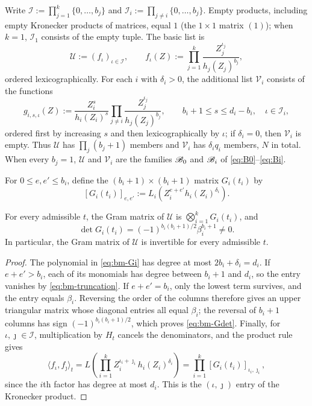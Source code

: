Write $\mathcal I:=\prod_{j=1}^k\{0,\ldots,b_j\}$ and
$\mathcal I_i:=\prod_{j\ne i}\{0,\ldots,b_j\}$. Empty products,
including empty Kronecker products of matrices, equal $1$ (the
$1\times1$ matrix $(1)$); when $k=1$, $\mathcal I_1$ consists of the
empty tuple. The basic list is
\begin{equation}\label{eq:bm-U}
\mathscr U:=(f_\iota)_{\iota\in\mathcal I},
\qquad
f_\iota(Z):=\prod_{j=1}^k\frac{Z_j^{\iota_j}}{h_j(Z_j)^{b_j}},
\end{equation}
ordered lexicographically. For each $i$ with $\delta_i>0$, the
additional list $\mathscr V_i$ consists of the functions
\begin{equation}\label{eq:bm-V}
g_{i,s,\iota}(Z):=\frac{Z_i^s}{h_i(Z_i)^s}
\prod_{j\ne i}\frac{Z_j^{\iota_j}}{h_j(Z_j)^{b_j}},
\qquad
b_i+1\le s\le d_i-b_i,\quad \iota\in\mathcal I_i,
\end{equation}
ordered first by increasing $s$ and then lexicographically by $\iota$;
if $\delta_i=0$, then $\mathscr V_i$ is empty. Thus $\mathscr U$ has
$\prod_j(b_j+1)$ members and $\mathscr V_i$ has $\delta_iq_i$ members,
$N$ in total. When every $b_j=1$, $\mathscr U$ and $\mathscr V_i$ are
the families $\mathscr B_0$ and $\mathscr B_i$ of \eqref{eq:B0}--\eqref{eq:Bi}.

For $0\le e,e'\le b_i$, define the $(b_i+1)\times(b_i+1)$ matrix
$G_i(t_i)$ by
\begin{equation}\label{eq:bm-Gi}
[G_i(t_i)]_{e,e'}:=L_i\!\left(Z_i^{e+e'}h_i(Z_i)^{\delta_i}\right).
\end{equation}

\begin{lemma}\label{lem:bm-basic}
For every admissible $t$, the Gram matrix of $\mathscr U$ is
$\bigotimes_{i=1}^kG_i(t_i)$, and
\begin{equation}\label{eq:bm-Gdet}
\det G_i(t_i)=(-1)^{b_i(b_i+1)/2}\beta_i^{b_i+1}\ne0 .
\end{equation}
In particular, the Gram matrix of $\mathscr U$ is invertible for every
admissible $t$.
\end{lemma}
\begin{proof}
The polynomial in \eqref{eq:bm-Gi} has degree at most
$2b_i+\delta_i=d_i$. If $e+e'>b_i$, each of its monomials has degree
between $b_i+1$ and $d_i$, so the entry vanishes by
\eqref{eq:bm-truncation}. If $e+e'=b_i$, only the lowest term
survives, and the entry equals $\beta_i$. Reversing the order of the
columns therefore gives an upper triangular matrix whose diagonal
entries all equal $\beta_i$; the reversal of $b_i+1$ columns has sign
$(-1)^{b_i(b_i+1)/2}$, which proves \eqref{eq:bm-Gdet}. Finally, for
$\iota,\jmath\in\mathcal I$, multiplication by $H_t$ cancels the
denominators, and the product rule gives
\begin{equation*}
\langle f_\iota,f_\jmath\rangle_t
=L\!\left(\prod_{i=1}^k Z_i^{\iota_i+\jmath_i}h_i(Z_i)^{\delta_i}\right)
=\prod_{i=1}^k[G_i(t_i)]_{\iota_i,\jmath_i},
\end{equation*}
since the $i$th factor has degree at most $d_i$. This is the
$(\iota,\jmath)$ entry of the Kronecker product.
\end{proof}

